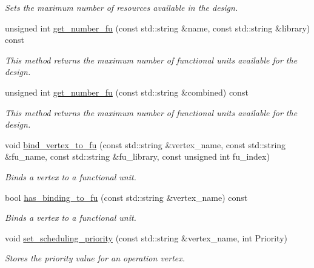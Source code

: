 \begin{DoxyCompactItemize}
\begin{DoxyCompactList}\small\item\em Sets the maximum number of resources available in the design. \end{DoxyCompactList}\item 
unsigned int \hyperlink{classHLS__constraints_a5ffda80abbda1488aaacca937993df74}{get\+\_\+number\+\_\+fu} (const std\+::string \&name, const std\+::string \&library) const
\begin{DoxyCompactList}\small\item\em This method returns the maximum number of functional units available for the design. \end{DoxyCompactList}\item 
unsigned int \hyperlink{classHLS__constraints_a6add734962a7ab1a103e95e9bb87cc30}{get\+\_\+number\+\_\+fu} (const std\+::string \&combined) const
\begin{DoxyCompactList}\small\item\em This method returns the maximum number of functional units available for the design. \end{DoxyCompactList}\item 
void \hyperlink{classHLS__constraints_a059b4544182407ed8966208698ab2428}{bind\+\_\+vertex\+\_\+to\+\_\+fu} (const std\+::string \&vertex\+\_\+name, const std\+::string \&fu\+\_\+name, const std\+::string \&fu\+\_\+library, const unsigned int fu\+\_\+index)
\begin{DoxyCompactList}\small\item\em Binds a vertex to a functional unit. \end{DoxyCompactList}\item 
bool \hyperlink{classHLS__constraints_ad09187107d9a2ad9a674a1c0f5e6ecae}{has\+\_\+binding\+\_\+to\+\_\+fu} (const std\+::string \&vertex\+\_\+name) const
\begin{DoxyCompactList}\small\item\em Binds a vertex to a functional unit. \end{DoxyCompactList}\item 
void \hyperlink{classHLS__constraints_ae62a3420be646725c3fc8dd777c03256}{set\+\_\+scheduling\+\_\+priority} (const std\+::string \&vertex\+\_\+name, int Priority)
\begin{DoxyCompactList}\small\item\em Stores the priority value for an operation vertex. \end{DoxyCompactList}\item 

\end{DoxyCompactItemize}
